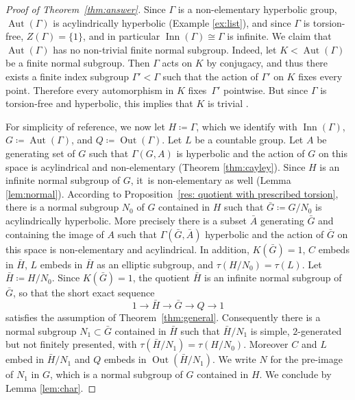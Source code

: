 \documentclass[11pt]{article}
\theoremstyle{definition}
\newcommand{\Aut}{\operatorname{Aut}}
\newcommand{\Out}{\operatorname{Out}}
\newcommand{\Inn}{\operatorname{Inn}}
\begin{document}
\begin{proof}[Proof of Theorem~\ref{thm:answer}]
Since $\Gamma$ is a non-elementary hyperbolic group, $\Aut(\Gamma)$ is acylindrically hyperbolic (Example \ref{ex:list}), and since $\Gamma$ is torsion-free, $Z(\Gamma) = \{ 1 \}$, and in particular $\Inn(\Gamma) \cong \Gamma$ is infinite. We claim that $\Aut(\Gamma)$ has no non-trivial finite normal subgroup. Indeed, let $K < \Aut(\Gamma)$ be a finite normal subgroup. Then $\Gamma$ acts on $K$ by conjugacy, and thus there exists a finite index subgroup $\Gamma' < \Gamma$ such that the action of $\Gamma'$ on $K$ fixes every point. Therefore every automorphism in $K$ fixes~$\Gamma'$ pointwise. But since $\Gamma$ is torsion-free and hyperbolic, this implies that $K$ is trivial \cite[Lem.\,2.2 \& 2.3]{root}.

For simplicity of reference, we now let $H \coloneqq \Gamma$, which we identify with $\Inn(\Gamma)$, $G \coloneqq \Aut(\Gamma)$, and $Q \coloneqq \Out(\Gamma)$.
Let $L$ be a countable group.
Let $A$ be generating set of $G$ such that $\Gamma(G,A)$ is hyperbolic and the action of $G$ on this space is acylindrical and non-elementary (Theorem \ref{thm:cayley}).
Since $H$ is an infinite normal subgroup of $G$, it~is non-elementary as well (Lemma \ref{lem:normal}).
According to Proposition~\ref{res: quotient with prescribed torsion}, there is a normal subgroup $N_0$ of $G$ contained in $H$ such that $\bar G \coloneqq G/N_0$ is acylindrically hyperbolic.
More precisely there is a subset $\bar A$ generating $\bar G$ and containing the image of $A$ such that $\Gamma(\bar G, \bar A)$ hyperbolic and the action of $\bar G$ on this space is non-elementary and acylindrical.
In addition, $K(\bar G) = 1$, $C$ embeds in $\bar H$, $L$ embeds in $\bar H$ as an elliptic subgroup, and $\tau(H/N_0) = \tau(L)$.
Let $\bar H \coloneqq H/N_0$.
Since $K(\bar G) = 1$, the quotient $\bar H$ is an infinite normal subgroup of $\bar G$, so that the short exact sequence
\begin{equation*}
1 \to \bar H \to \bar G \to Q \to 1
\end{equation*}
satisfies the assumption of Theorem~\ref{thm:general}.
Consequently there is a normal subgroup $N_1 \subset \bar G$ contained in $\bar H$ such that $\bar H/N_1$ is simple, $2$-generated but not finitely presented, with $\tau(\bar H/N_1) = \tau(H/N_0)$.
Moreover $C$ and $L$ embed in $\bar H/N_1$ and $Q$ embeds in $\Out(\bar H/N_1)$.
We write $N$ for the pre-image of $N_1$ in $G$,
which is a normal subgroup of $G$ contained in $H$.
We conclude by Lemma \ref{lem:char}.
\end{proof}
\end{document}
